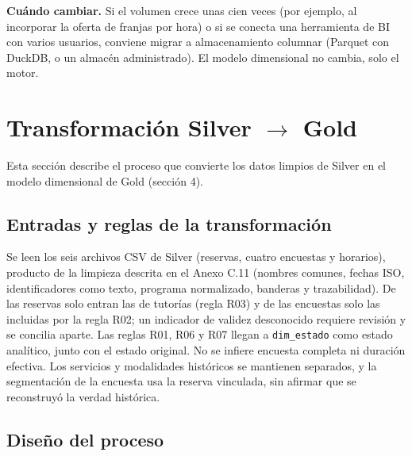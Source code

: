 \documentclass[11pt,letterpaper]{article}
\begin{document}
\textbf{Cuándo cambiar.} Si el volumen crece unas cien veces (por ejemplo, al incorporar la oferta de franjas por hora) o si se conecta una herramienta de BI con varios usuarios, conviene migrar a almacenamiento columnar (Parquet con DuckDB, o un almacén administrado). El modelo dimensional no cambia, solo el motor.


\section{Transformación Silver $\rightarrow$ Gold}

Esta sección describe el proceso que convierte los datos limpios de Silver en el modelo dimensional de Gold (sección 4).

\subsection{Entradas y reglas de la transformación}

Se leen los seis archivos CSV de Silver (reservas, cuatro encuestas y horarios), producto de la limpieza descrita en el Anexo C.11 (nombres comunes, fechas ISO, identificadores como texto, programa normalizado, banderas y trazabilidad). De las reservas solo entran las de tutorías (regla R03) y de las encuestas solo las incluidas por la regla R02; un indicador de validez desconocido requiere revisión y se concilia aparte. Las reglas R01, R06 y R07 llegan a \texttt{dim\_\allowbreak{}estado} como estado analítico, junto con el estado original. No se infiere encuesta completa ni duración efectiva. Los servicios y modalidades históricos se mantienen separados, y la segmentación de la encuesta usa la reserva vinculada, sin afirmar que se reconstruyó la verdad histórica.

\subsection{Diseño del proceso}
\end{document}
